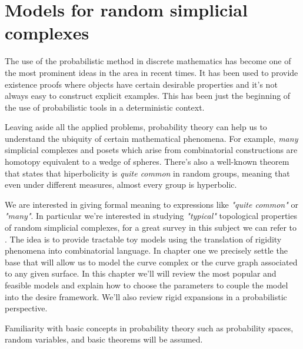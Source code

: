 
\chapter{Models for random simplicial complexes} %

\label{Chapter2} %



The use of the probabilistic method in discrete mathematics has become one of the most prominent ideas in the area in recent times. It has been used to provide existence proofs where objects have certain desirable properties and it's not always easy to construct explicit examples. This has been just the beginning of the use of probabilistic tools in a deterministic context.

Leaving aside all the applied problems, probability theory can help us to understand the ubiquity of certain mathematical phenomena. For example, \textit{many} simplicial complexes and posets which arise from combinatorial constructions are homotopy equivalent to a wedge of spheres. There's also a well-known theorem that states that hiperbolicity is \textit{quite common} in random groups, meaning that even under different measures, almost every group is hyperbolic.

We are interested in giving formal meaning to expressions like \textit{"quite common"} or \textit{"many"}. In particular we're interested in studying \textit{"typical"} topological properties of random simplicial complexes, for a great survey in this subject we can refer to \cite[M. Khale]{surveyStochastic}. The idea is to provide tractable toy models using the translation of rigidity phenomena into combinatorial language. In chapter one we precisely settle the base that will allow us to model the curve complex or the curve graph associated to any given surface. In this chapter we'll will review the most popular and feasible models and explain how to choose the parameters to couple the model into the desire framework. We'll also review rigid expansions in a probabilistic perspective.

Familiarity with basic concepts in probability theory such as probability spaces, random variables, and basic theorems will be assumed.

